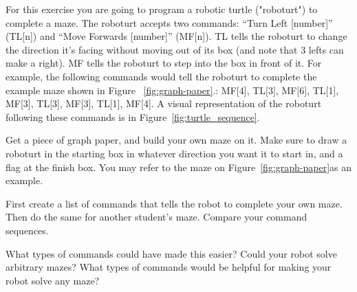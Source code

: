 \begin{exercise}

For this exercise you are going to program a robotic turtle ("roboturt") to complete a maze. The roboturt accepts two commands:  ``Turn Left [number]'' (TL[n]) and ``Move Forwards [number]'' (MF[n]). TL tells the roboturt to change the direction it's facing without moving out of its box (and note that 3 lefts can make a right). MF tells the roboturt to step into the box in front of it. For example, the following commands would tell the roboturt to complete the example maze shown in Figure ~\ref{fig:graph-paper}.: MF[4], TL[3], MF[6], TL[1], MF[3], TL[3], MF[3], TL[1], MF[4]. A visual representation of the roboturt following these commands is in Figure~\ref{fig:turtle_sequence}.

  Get a piece of graph paper, and build your own maze on it. Make sure to draw a roboturt in the starting box in whatever direction you want it to start in, and a flag at the finish box. You may refer to the maze on Figure~\ref{fig:graph-paper}as an example. 
  
First create a list of commands that tells the robot to complete your own maze. Then do the same for another student's maze. Compare your command sequences. 

  What types of commands could have made this easier? Could your robot solve
  arbitrary mazes? What types of commands would be helpful for making your robot
  solve any maze?
\end{exercise}


